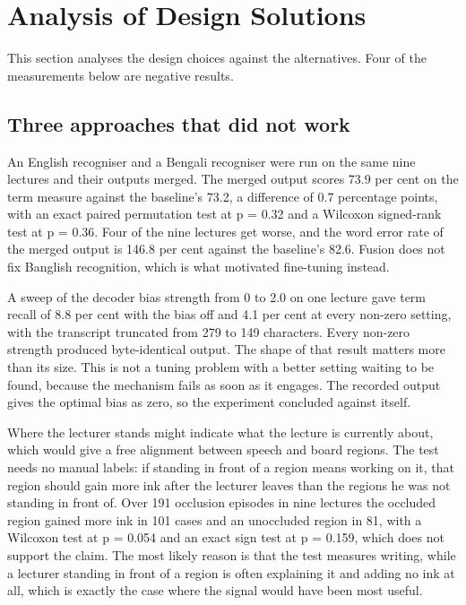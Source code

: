 \section{Analysis of Design Solutions}

This section analyses the design choices against the alternatives. Four of the
measurements below are negative results.

\subsection{Three approaches that did not work}

An English recogniser and a Bengali recogniser were run on the same nine lectures and
their outputs merged. The merged output scores 73.9 per cent on the term measure against
the baseline's 73.2, a difference of 0.7 percentage points, with an exact paired
permutation test at p = 0.32 and a Wilcoxon signed-rank test at p = 0.36. Four of the nine
lectures get worse, and the word error rate of the merged output is 146.8 per cent against
the baseline's 82.6. Fusion does not fix Banglish recognition, which is what motivated
fine-tuning instead.

A sweep of the decoder bias strength from 0 to 2.0 on one lecture gave term recall of 8.8
per cent with the bias off and 4.1 per cent at every non-zero setting, with the transcript
truncated from 279 to 149 characters. Every non-zero strength produced byte-identical
output. The shape of that result matters more than its size. This is not a tuning problem
with a better setting waiting to be found, because the mechanism fails as soon as it
engages. The recorded output gives the optimal bias as zero, so the experiment concluded
against itself.

Where the lecturer stands might indicate what the lecture is currently about, which would
give a free alignment between speech and board regions. The test needs no manual labels:
if standing in front of a region means working on it, that region should gain more ink
after the lecturer leaves than the regions he was not standing in front of. Over 191
occlusion episodes in nine lectures the occluded region gained more ink in 101 cases and
an unoccluded region in 81, with a Wilcoxon test at p = 0.054 and an exact sign test at p
= 0.159, which does not support the claim. The most likely reason is that the test
measures writing, while a lecturer standing in front of a region is often explaining it
and adding no ink at all, which is exactly the case where the signal would have been most
useful.

